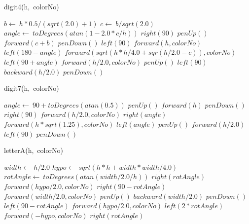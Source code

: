 \documentclass[a4paper,10pt]{article}
\begin{document}
\begin{algorithm}
\caption{digit4(h,\ colorNo)}
\begin{algorithmic}[5]

\STATE {}
\STATE {}
  \STATE \(b\gets\ h*0.5/(sqrt(2.0)+1)\)
  \STATE \(c\gets\ b/sqrt(2.0)\)
  \STATE \(angle\gets\ toDegrees(atan(1-2.0*c/h))\)
  \STATE \(right(90)\)
  \STATE \(penUp()\)
  \STATE \(forward(c+b)\)
  \STATE \(penDown()\)
  \STATE \(left(90)\)
  \STATE \(forward(h,colorNo)\)
  \STATE \(left(180-angle)\)
  \STATE \(forward(sqrt(h*h/4.0+sqr(h/2.0-c)),colorNo)\)
  \STATE \(left(90+angle)\)
  \STATE \(forward(h/2.0,colorNo)\)
  \STATE \(penUp()\)
  \STATE \(left(90)\)
  \STATE \(backward(h/2.0)\)
  \STATE \(penDown()\)

\end{algorithmic}
\end{algorithm}


\begin{algorithm}
\caption{digit7(h,\ colorNo)}
\begin{algorithmic}[5]

\STATE {}
\STATE {}
  \STATE \(angle\gets\ 90+toDegrees(atan(0.5))\)
  \STATE \(penUp()\)
  \STATE \(forward(h)\)
  \STATE \(penDown()\)
  \STATE \(right(90)\)
  \STATE \(forward(h/2.0,colorNo)\)
  \STATE \(right(angle)\)
  \STATE \(forward(h*sqrt(1.25),colorNo)\)
  \STATE \(left(angle)\)
  \STATE \(penUp()\)
  \STATE \(forward(h/2.0)\)
  \STATE \(left(90)\)
  \STATE \(penDown()\)

\end{algorithmic}
\end{algorithm}


\begin{algorithm}
\caption{letterA(h,\ colorNo)}
\begin{algorithmic}[5]

\STATE {}
\STATE {}
  \STATE \(width\gets\ h/2.0\)
  \STATE \(hypo\gets\ sqrt(h*h+width*width/4.0)\)
  \STATE \(rotAngle\gets\ toDegrees(atan(width/2.0/h))\)
  \STATE \(right(rotAngle)\)
  \STATE \(forward(hypo/2.0,colorNo)\)
  \STATE \(right(90-rotAngle)\)
  \STATE \(forward(width/2.0,colorNo)\)
  \STATE \(penUp()\)
  \STATE \(backward(width/2.0)\)
  \STATE \(penDown()\)
  \STATE \(left(90-rotAngle)\)
  \STATE \(forward(hypo/2.0,colorNo)\)
  \STATE \(left(2*rotAngle)\)
  \STATE \(forward(-hypo,colorNo)\)
  \STATE \(right(rotAngle)\)

\end{algorithmic}
\end{algorithm}
\end{document}
